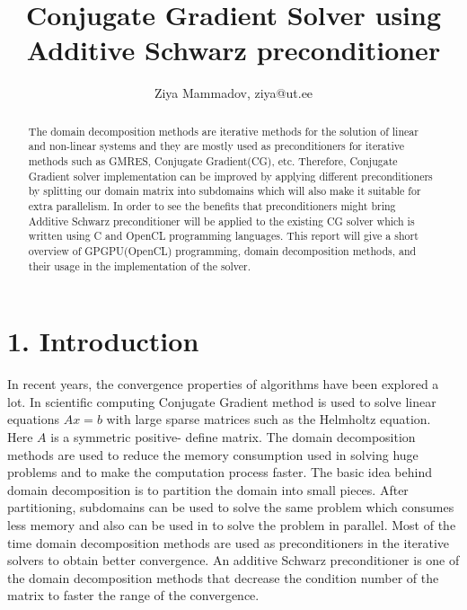 \documentclass[times]{TRR}
\begin{document}
\runninghead{}

\title{Conjugate Gradient Solver using Additive Schwarz preconditioner}

\author{Ziya Mammadov, ziya@ut.ee}

\begin{abstract}
The domain decomposition methods are iterative methods for the solution of linear and non-linear systems and they are mostly used as preconditioners for iterative methods such as GMRES, Conjugate Gradient(CG), etc.  Therefore, Conjugate Gradient solver implementation can be improved by applying different preconditioners by splitting our domain matrix into subdomains which will also make it suitable for extra parallelism. In order to see the benefits that preconditioners might bring Additive Schwarz preconditioner will be applied to the existing CG solver which is written using C and OpenCL programming languages. This report will give a short overview of GPGPU(OpenCL) programming, domain decomposition methods, and their usage in the implementation of the solver.
\end{abstract}

\maketitle

\section{1. Introduction}
In recent years, the convergence properties of algorithms have been explored a lot.
In scientific computing Conjugate Gradient method is used to solve linear equations
$Ax = b$ with large sparse matrices such as the Helmholtz equation. Here $A$ is a symmetric positive- define matrix. The domain decomposition methods are used to reduce the memory consumption used in solving huge problems and to make the computation process faster. The basic idea behind domain decomposition is to partition the domain into small pieces. After partitioning, subdomains can be used to solve the same problem which consumes less memory and also can be used in to solve the problem in parallel. Most of the time domain decomposition methods are used as preconditioners in the iterative solvers to obtain better convergence. An additive Schwarz preconditioner is one of the domain decomposition methods that decrease the condition number of the matrix to faster the range of the convergence. 
\end{document}
